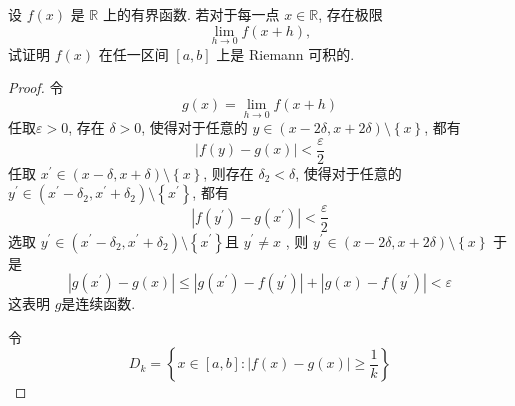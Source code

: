 \documentclass[../main.tex]{subfiles}
\begin{document}
\begin{exercise}{}{}
设 $f(x)$ 是 $\mathbb{R}$ 上的有界函数. 若对于每一点 $x\in\mathbb{R}$, 存在极限
\[\lim_{h\to 0}f(x+h),\]
试证明 $f(x)$ 在任一区间 $[a,b]$ 上是 Riemann 可积的.
\end{exercise}
\begin{proof}
    令  \[
    g\left( x \right)= \lim_{h\to 0}f\left( x+ h \right)  
    \] 任取\(   \varepsilon > 0  \), 存在 \(   \delta > 0  \), 使得对于任意的 \(  y\in \left( x-2 \delta ,x+  2\delta  \right)  \setminus \left\{ x \right\} \), 都有 \[
    \left| f\left( y \right)-g\left( x \right)   \right|<  \frac{ \varepsilon  }{2 }  
    \] 任取 \( x^{\prime}  \in \left( x- \delta ,x+  \delta  \right) \setminus \left\{ x \right\}  \), 则存在 \(   \delta _2 <  \delta   \), 使得对于任意的 \( y^{\prime} \in \left( x^{\prime} - \delta _2 , x^{\prime} +  \delta _2  \right)    \setminus \left\{ x^{\prime}  \right\}\), 都有 \[
    \left| f\left( y^{\prime}  \right)-g\left( x^{\prime}  \right)   \right|< \frac{ \varepsilon  }{2 }  
    \]  选取 \(  y^{\prime} \in \left( x^{\prime} - \delta _2 ,x^{\prime} +  \delta _2  \right)\setminus \left\{ x^{\prime}  \right\}    \)且 \(  y^{\prime} \neq x  \) , 则 \(  y^{\prime} \in \left( x-2 \delta ,x+ 2 \delta  \right)\setminus \left\{ x \right\}   \)   于是 \[
    \left| g\left( x^{\prime}  \right)-g\left( x \right)   \right|\le \left| g\left( x^{\prime}  \right)-f\left( y^{\prime}  \right)   \right|+ \left| g\left( x \right)-f\left( y^{\prime}  \right)   \right|   <  \varepsilon 
    \]这表明 \(  g  \)是连续函数. 


    令 \[
    D_{k}= \left\{ x\in \left[ a,b \right] : \left| f\left( x \right)-g\left( x \right)   \right|\ge  \frac{1 }{k } \right\}
    \]


\end{proof}
\end{document}
